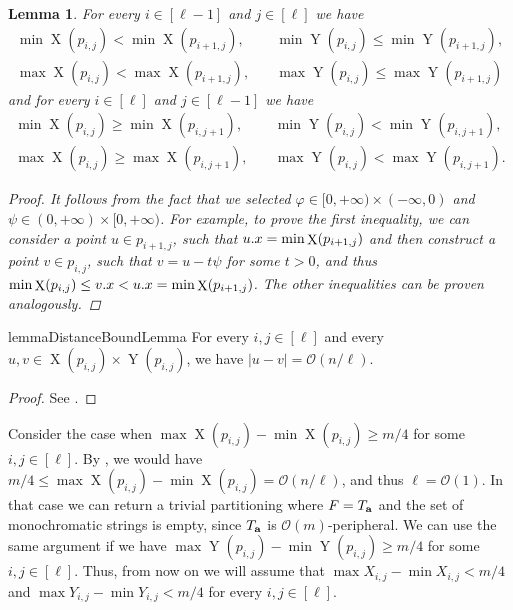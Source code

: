 \documentclass[11pt, letterpaper]{article}
\theoremstyle{plain}
\newtheorem{lemma}{Lemma}
\theoremstyle{definition}
\theoremstyle{remark}
\renewcommand{\O}{\mathcal{O}}
\renewcommand{\phi}{\varphi}
\newcommand{\eq}[1]{\begin{align*} #1 \end{align*}}
\DeclareMathOperator*{\X}{X}
\DeclareMathOperator*{\Y}{Y}
\begin{document}
\begin{lemma}\label{monotonicity_lemma}
	For every $i \in [\ell - 1]$ and $j \in [\ell]$ we have
	\eq{
	\min \X(p_{i, j}) < \min \X(p_{i + 1, j}), \quad
	&\min \Y(p_{i, j}) \le \min \Y(p_{i + 1, j}), \\
	\max \X(p_{i, j}) < \max \X(p_{i + 1, j}), \quad
	&\max \Y(p_{i, j}) \le \max \Y(p_{i + 1, j})
	}
	and for every $i \in [\ell]$ and $j \in [\ell - 1]$ we have
	\eq{
		\min \X(p_{i, j}) \ge \min \X(p_{i, j + 1}), \quad
		&\min \Y(p_{i, j}) < \min \Y(p_{i, j + 1}), \\
		\max \X(p_{i, j}) \ge \max \X(p_{i, j + 1}), \quad
		&\max \Y(p_{i, j}) < \max \Y(p_{i, j + 1}).
	}
	\begin{proof}
		It follows from the fact that we selected $\phi \in [0, +\infty) \times (-\infty, 0)$ and $\psi \in (0, +\infty) \times [0, +\infty)$.
		For example, to prove the first inequality, we can consider a point $u \in p_{i + 1, j}$, such that $\x{u} = \min \X(p_{i + 1, j})$
		and then construct a point $v \in p_{i, j}$, such that $v = u - t\psi$ for some $t > 0$, and thus $\min \X(p_{i, j}) \le \x{v} < \x{u} = \min \X(p_{i + 1, j})$.
		The other inequalities can be proven analogously.
	\end{proof}
\end{lemma}

\begin{restatable*}{lemma}{DistanceBoundLemma}\label{distance_bound_lemma}
	For every $i, j \in [\ell]$ and every $u, v \in \X(p_{i, j}) \times \Y(p_{i, j})$, we have $|u - v| = \O(n / \ell)$.
\end{restatable*}
\begin{proof} See . \end{proof}

Consider the case when $\max \X(p_{i, j}) - \min \X(p_{i, j}) \ge m / 4$ for some $i, j \in [\ell]$.
By , we would have $m / 4 \le \max \X(p_{i, j}) - \min \X(p_{i, j}) = \O(n / \ell)$, and thus $\ell = \O(1)$.
In that case we can return a trivial partitioning where $F = T_\mathbf{a}$ and the set of monochromatic strings is empty, since $T_\mathbf{a}$ is $\O(m)$-peripheral.
We can use the same argument if we have $\max \Y(p_{i, j}) - \min \Y(p_{i, j}) \ge m / 4$ for some $i, j \in [\ell]$.
Thus, from now on we will assume that $\max X_{i, j} - \min X_{i, j} < m / 4$ and $\max Y_{i, j} - \min Y_{i, j} < m / 4$ for every $i, j \in [\ell]$. 
\end{document}

